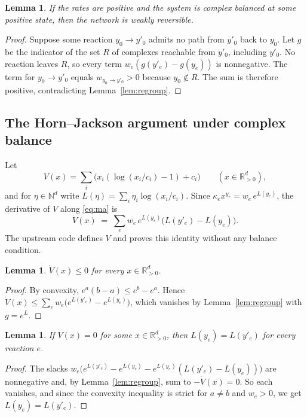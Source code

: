 \documentclass[11pt]{article}
\newcommand{\N}{\mathbb{N}}
\newcommand{\Rpos}{\mathbb{R}^{d}_{>0}}
\theoremstyle{plain}
\newtheorem{lemma}[theorem]{Lemma}
\theoremstyle{definition}
\theoremstyle{remark}
\begin{document}
\begin{lemma}\label{lem:wr}
If the rates are positive and the system is complex balanced at some positive state, then the network is weakly reversible.
\end{lemma}

\begin{proof}
Suppose some reaction $y_0 \to y'_0$ admits no path from $y'_0$ back to $y_0$. Let $g$ be the indicator of the set $R$ of complexes reachable from $y'_0$, including $y'_0$. No reaction leaves $R$, so every term $w_e(g(y'_e) - g(y_e))$ is nonnegative. The term for $y_0 \to y'_0$ equals $w_{y_0 \to y'_0} > 0$ because $y_0 \notin R$. The sum is therefore positive, contradicting Lemma~\ref{lem:regroup}.
\end{proof}

\subsection{The Horn--Jackson argument under complex balance}

Let
\[
V(x) = \sum_i \bigl(x_i(\log(x_i/c_i) - 1) + c_i\bigr) \qquad (x \in \Rpos),
\]
and for $\eta \in \N^d$ write $L(\eta) = \sum_i \eta_i \log(x_i/c_i)$. Since $\kappa_e x^{y_e} = w_e\, e^{L(y_e)}$, the derivative of $V$ along \eqref{eq:ma} is
\[
\dot V(x) \;=\; \sum_e w_e\, e^{L(y_e)}\bigl(L(y'_e) - L(y_e)\bigr).
\]
The upstream code defines $V$ and proves this identity without any balance condition.

\begin{lemma}\label{lem:dissip}
$\dot V(x) \le 0$ for every $x \in \Rpos$.
\end{lemma}

\begin{proof}
By convexity, $e^a(b - a) \le e^b - e^a$. Hence $\dot V(x) \le \sum_e w_e\bigl(e^{L(y'_e)} - e^{L(y_e)}\bigr)$, which vanishes by Lemma~\ref{lem:regroup} with $g = e^{L}$.
\end{proof}

\begin{lemma}\label{lem:gap}
If $\dot V(x) = 0$ for some $x \in \Rpos$, then $L(y_e) = L(y'_e)$ for every reaction $e$.
\end{lemma}

\begin{proof}
The slacks $w_e\bigl(e^{L(y'_e)} - e^{L(y_e)} - e^{L(y_e)}(L(y'_e) - L(y_e))\bigr)$ are nonnegative and, by Lemma~\ref{lem:regroup}, sum to $-\dot V(x) = 0$. So each vanishes, and since the convexity inequality is strict for $a \ne b$ and $w_e > 0$, we get $L(y_e) = L(y'_e)$.
\end{proof}
\end{document}
